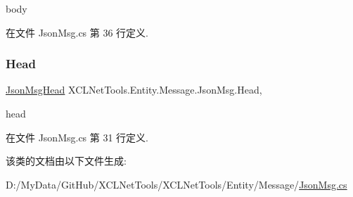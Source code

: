 body 



在文件 Json\+Msg.\+cs 第 36 行定义.

\mbox{\label{class_x_c_l_net_tools_1_1_entity_1_1_message_1_1_json_msg_a563af2b66f8c22c04ff557cfe34f2479}} 
\subsubsection{\texorpdfstring{Head}{Head}}
{\footnotesize\ttfamily \hyperlink{class_x_c_l_net_tools_1_1_entity_1_1_message_1_1_json_msg_head}{Json\+Msg\+Head} X\+C\+L\+Net\+Tools.\+Entity.\+Message.\+Json\+Msg.\+Head\hspace{0.3cm}{\ttfamily [get]}, {\ttfamily [set]}}



head 



在文件 Json\+Msg.\+cs 第 31 行定义.



该类的文档由以下文件生成\+:\begin{DoxyCompactItemize}
\item 
D\+:/\+My\+Data/\+Git\+Hub/\+X\+C\+L\+Net\+Tools/\+X\+C\+L\+Net\+Tools/\+Entity/\+Message/\hyperlink{_json_msg_8cs}{Json\+Msg.\+cs}\end{DoxyCompactItemize}
